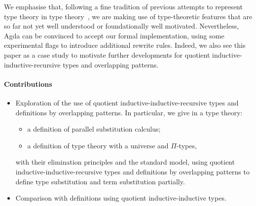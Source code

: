 \documentclass[a4paper,UKenglish,numberwithinsect,cleveref,thm-restate]{lipics-v2021}
\begin{document}

%
We emphasise that, following a fine tradition of previous attempts to represent type theory in type theory~\cite{Danielsson2006,Chapman2009,Altenkirch2016a}, we are making use of type-theoretic features that are so far not yet well understood or foundationally well motivated.
Nevertheless, Agda can be convinced to accept our formal implementation, using some experimental flags to introduce additional rewrite rules.
Indeed, we also see this paper as a case study to motivate further developments for quotient inductive-inductive-recursive types and overlapping patterns.

\paragraph*{Contributions}
\begin{itemize}
  \item Exploration of the use of quotient inductive-inductive-recursive types and definitions by overlapping patterns.
    In particular, we give in a type theory:
    \begin{itemize}
      \item a definition of parallel substitution calculus;
      \item a definition of type theory with a universe and $\Pi$-types,
    \end{itemize}
   with their elimination principles and the standard model, 
   using quotient inductive-inductive-recursive types and definitions by overlapping patterns to define type substitution and term substitution partially.
  \item Comparison with definitions using quotient inductive-inductive types.
\end{itemize}
\end{document}
